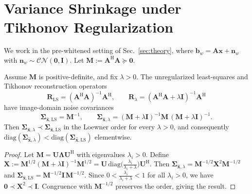 \documentclass[AMA,STIX2COL,Linenumberson]{MRM}
\begin{document}
 
\section{Variance Shrinkage under Tikhonov Regularization}
\label{app:tik-variance}
 
We work in the pre-whitened setting of 
Sec.~\ref{sec:theory}, where
$\mathbf{b}_w = \mathbf{A}\mathbf{x} + \mathbf{n}_w$
with $\mathbf{n}_w \sim \mathcal{CN}(\mathbf{0}, \mathbf{I})$.
Let $\mathbf{M} := \mathbf{A}^{\mathrm{H}}\mathbf{A} 
\succeq \mathbf{0}$.
 
\begin{proposition}
\label{prop:tik-variance-shrink-app}
Assume $\mathbf{M}$ is positive-definite, and fix $\lambda > 0$. The unregularized least-squares and Tikhonov reconstruction operators
\[
\mathbf{R}_{\mathrm{LS}}
= (\mathbf{A}^{\mathrm{H}}\mathbf{A})^{-1}
  \mathbf{A}^{\mathrm{H}},
\qquad
\mathbf{R}_{\lambda}
= (\mathbf{A}^{\mathrm{H}}\mathbf{A}+\lambda\mathbf{I})^{-1}
  \mathbf{A}^{\mathrm{H}}
\]
have image-domain noise covariances
\[
\boldsymbol{\Sigma}_{\hat{\mathbf{x}},\mathrm{LS}}
= \mathbf{M}^{-1},
\qquad
\boldsymbol{\Sigma}_{\hat{\mathbf{x}},\lambda}
= (\mathbf{M}+\lambda\mathbf{I})^{-1}
  \mathbf{M}\,
  (\mathbf{M}+\lambda\mathbf{I})^{-1}.
\]
Then 
$\boldsymbol{\Sigma}_{\hat{\mathbf{x}},\lambda} 
\prec \boldsymbol{\Sigma}_{\hat{\mathbf{x}},\mathrm{LS}}$
in the Loewner order for every $\lambda > 0$, and 
consequently
$\mathrm{diag}(\boldsymbol{\Sigma}_{\hat{\mathbf{x}},\lambda})
< \mathrm{diag}(\boldsymbol{\Sigma}_{\hat{\mathbf{x}},\mathrm{LS}})$
elementwise.
\end{proposition}
 
\begin{proof}
Let $\mathbf{M} 
= \mathbf{U}\boldsymbol{\Lambda}\mathbf{U}^{\mathrm{H}}$
with eigenvalues $\lambda_i > 0$. Define
$\mathbf{X} 
:= \mathbf{M}^{1/2}(\mathbf{M}+\lambda\mathbf{I})^{-1}
   \mathbf{M}^{1/2}
= \mathbf{U}\,
  \mathrm{diag}\!\bigl(\tfrac{\lambda_i}{\lambda_i+\lambda}\bigr)
  \mathbf{U}^{\mathrm{H}}$.
Then
$\boldsymbol{\Sigma}_{\hat{\mathbf{x}},\lambda}
= \mathbf{M}^{-1/2}\mathbf{X}^2\mathbf{M}^{-1/2}$
and
$\boldsymbol{\Sigma}_{\hat{\mathbf{x}},\mathrm{LS}}
= \mathbf{M}^{-1/2}\mathbf{I}\,\mathbf{M}^{-1/2}$.
Since $0 < \tfrac{\lambda_i}{\lambda_i+\lambda} < 1$ for all 
$\lambda_i > 0$, we have 
$\mathbf{0} \prec \mathbf{X}^2 \prec \mathbf{I}$.
Congruence with $\mathbf{M}^{-1/2}$ preserves the order, 
giving the result.
\end{proof}
 
\end{document}
